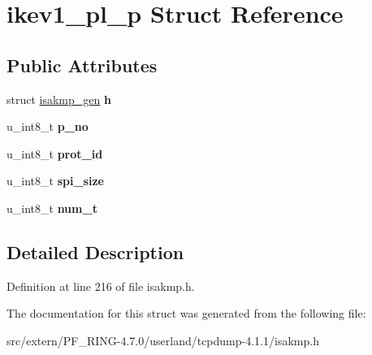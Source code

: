 \hypertarget{structikev1__pl__p}{
\section{ikev1\_\-pl\_\-p Struct Reference}
\label{structikev1__pl__p}
}
\subsection*{Public Attributes}
\begin{DoxyCompactItemize}
\item 
\hypertarget{structikev1__pl__p_a9d57015821fae8a37b94b0a099cb3c13}{
struct \hyperlink{structisakmp__gen}{isakmp\_\-gen} {\bfseries h}}
\label{structikev1__pl__p_a9d57015821fae8a37b94b0a099cb3c13}

\item 
\hypertarget{structikev1__pl__p_a133997d0d67e2b85281d2f7556db4c9b}{
u\_\-int8\_\-t {\bfseries p\_\-no}}
\label{structikev1__pl__p_a133997d0d67e2b85281d2f7556db4c9b}

\item 
\hypertarget{structikev1__pl__p_a4f3722ea0e7ed9d18f1aeab2d7be277c}{
u\_\-int8\_\-t {\bfseries prot\_\-id}}
\label{structikev1__pl__p_a4f3722ea0e7ed9d18f1aeab2d7be277c}

\item 
\hypertarget{structikev1__pl__p_afa489b30ece0f2ecfd5608e8d6211158}{
u\_\-int8\_\-t {\bfseries spi\_\-size}}
\label{structikev1__pl__p_afa489b30ece0f2ecfd5608e8d6211158}

\item 
\hypertarget{structikev1__pl__p_ac4f2ab44f69268ff3f0a66ea95a69685}{
u\_\-int8\_\-t {\bfseries num\_\-t}}
\label{structikev1__pl__p_ac4f2ab44f69268ff3f0a66ea95a69685}

\end{DoxyCompactItemize}


\subsection{Detailed Description}


Definition at line 216 of file isakmp.h.



The documentation for this struct was generated from the following file:\begin{DoxyCompactItemize}
\item 
src/extern/PF\_\-RING-\/4.7.0/userland/tcpdump-\/4.1.1/isakmp.h\end{DoxyCompactItemize}

